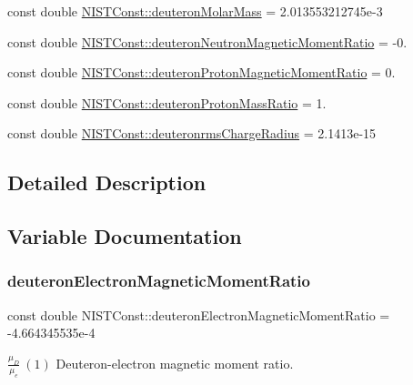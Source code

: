 \begin{DoxyCompactItemize}
const double \hyperlink{group___deuteron_ga19086965236aae3504b4c0efb1cfaf41}{N\+I\+S\+T\+Const\+::deuteron\+Molar\+Mass} = 2.\+013553212745e-\/3
\item 
const double \hyperlink{group___deuteron_gaad8a0231ec17f5669c9c22a4daba5a77}{N\+I\+S\+T\+Const\+::deuteron\+Neutron\+Magnetic\+Moment\+Ratio} = -\/0.
\item 
const double \hyperlink{group___deuteron_gaac523a6a3c61390396544e4b0acb3c05}{N\+I\+S\+T\+Const\+::deuteron\+Proton\+Magnetic\+Moment\+Ratio} = 0.
\item 
const double \hyperlink{group___deuteron_gabe2731d4997c2227da2cc2d7e7cda194}{N\+I\+S\+T\+Const\+::deuteron\+Proton\+Mass\+Ratio} = 1.
\item 
const double \hyperlink{group___deuteron_gaef4ebab0e996f7ac1934663efbd32aed}{N\+I\+S\+T\+Const\+::deuteronrms\+Charge\+Radius} = 2.\+1413e-\/15
\end{DoxyCompactItemize}


\subsection{Detailed Description}


\subsection{Variable Documentation}
\mbox{\label{group___deuteron_gaa01fffefa3ab64430fabf08808572689}} 
\subsubsection{\texorpdfstring{deuteron\+Electron\+Magnetic\+Moment\+Ratio}{deuteronElectronMagneticMomentRatio}}
{\footnotesize\ttfamily const double N\+I\+S\+T\+Const\+::deuteron\+Electron\+Magnetic\+Moment\+Ratio = -\/4.\+664345535e-\/4}

$\frac{\mu_D}{\mu_e} \ (1)$ Deuteron-\/electron magnetic moment ratio. \mbox{\label{group___deuteron_gaf25b1cce3ab8e1ec7f4f7790ea06ad0b}} 
